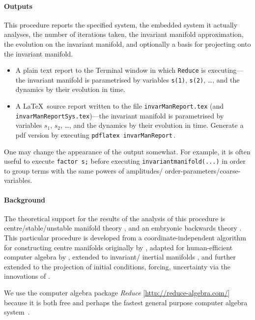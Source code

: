 \documentclass[11pt,a5paper]{article}
\begin{document}
\paragraph{Outputs}  This procedure reports the specified
system, the embedded system it actually analyses, the number
of iterations taken, the invariant manifold approximation,
the evolution on the invariant manifold, and optionally a
basis for projecting onto the invariant manifold.
\begin{itemize}
\item A plain text report to the Terminal window in which
\verb|Reduce| is executing---the invariant manifold is
parametrised by variables \verb|s(1)|, \verb|s(2)|, \ldots,
and the dynamics by their evolution in time.
\item A \LaTeX\ source report written to the file
\verb|invarManReport.tex| (and
\verb|invarManReportSys.tex|)---the invariant manifold is
parametrised by variables \(s_1\), \(s_2\), \ldots, and the
dynamics by their evolution in time.  Generate a pdf version
by executing \verb|pdflatex invarManReport|\,.
\end{itemize}
One may change the appearance of the output somewhat. For
example, it is often useful to execute  \verb|factor s;|
before executing \verb|invariantmanifold(...)| in order to
group terms with the same powers of amplitudes\slash
order-parameters\slash coarse-variables.


\paragraph{Background}
The theoretical support for the results of the analysis of
this procedure is centre\slash stable\slash unstable
manifold theory \cite[e.g.,][]{Carr81, Haragus2011,
Roberts2014a}, and an embryonic backwards theory
\cite[]{Roberts2018a}. This particular procedure is
developed from a coordinate-independent algorithm for
constructing centre manifolds originally by
\cite{Coullet83}, adapted for human-efficient computer
algebra by \cite{Roberts96a}, extended to invariant\slash
inertial manifolds \cite[]{Roberts89, Foias88b}, and further
extended to the projection of initial conditions, forcing,
uncertainty via the innovations of \cite{Roberts89b,
Roberts97b}.

We use the computer algebra package \emph{Reduce} 
[\url{http://reduce-algebra.com/}] because it is both free 
and perhaps the fastest general purpose computer algebra 
system~\cite[e.g.]{Fateman2002}.
\end{document}
